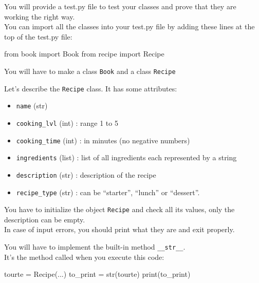 \documentclass[]{article}
\newenvironment{Shaded}{\begin{snugshade}}{\end{snugshade}}
\newcommand{\BuiltInTok}[1]{\textcolor[rgb]{0.50,0.55,0.55}{#1}}
\newcommand{\ImportTok}[1]{\textcolor[rgb]{0.15,0.68,0.38}{#1}}
\newcommand{\NormalTok}[1]{\textcolor[rgb]{0.81,0.81,0.76}{#1}}
\newcommand{\OperatorTok}[1]{\textcolor[rgb]{0.81,0.81,0.76}{#1}}
\begin{document}
You will provide a test.py file to test your classes and prove that they
are working the right way.\\
You can import all the classes into your test.py file by adding these
lines at the top of the test.py file:

\begin{Shaded}
\begin{Highlighting}[]
\ImportTok{from}\NormalTok{ book }\ImportTok{import}\NormalTok{ Book}
\ImportTok{from}\NormalTok{ recipe }\ImportTok{import}\NormalTok{ Recipe}
\end{Highlighting}
\end{Shaded}

You will have to make a class \texttt{Book} and a class \texttt{Recipe}

Let's describe the \texttt{Recipe} class. It has some attributes:

\begin{itemize}
\item
  \texttt{name} (str)
\item
  \texttt{cooking\_lvl} (int) : range 1 to 5
\item
  \texttt{cooking\_time} (int) : in minutes (no negative numbers)
\item
  \texttt{ingredients} (list) : list of all ingredients each represented
  by a string
\item
  \texttt{description} (str) : description of the recipe
\item
  \texttt{recipe\_type} (str) : can be ``starter'', ``lunch'' or
  ``dessert''.
\end{itemize}

You have to initialize the object \texttt{Recipe} and check all its
values, only the description can be empty.\\
In case of input errors, you should print what they are and exit
properly.

You will have to implement the built-in method \texttt{\_\_str\_\_}.\\
It's the method called when you execute this code:

\begin{Shaded}
\begin{Highlighting}[]
\NormalTok{tourte }\OperatorTok{=}\NormalTok{ Recipe(...)}
\NormalTok{to_print }\OperatorTok{=} \BuiltInTok{str}\NormalTok{(tourte)}
\BuiltInTok{print}\NormalTok{(to_print)}
\end{Highlighting}
\end{Shaded}
\end{document}
